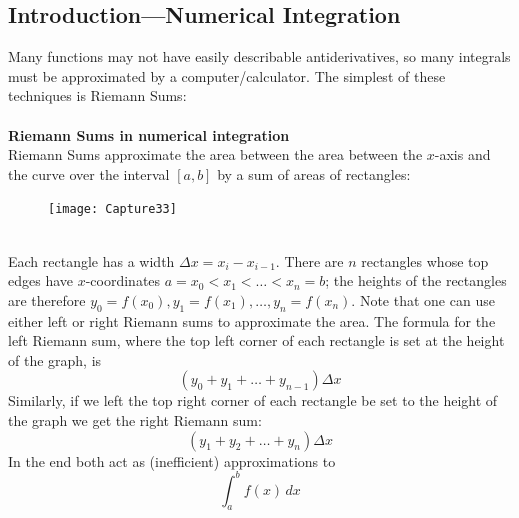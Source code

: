 \documentclass{report}
\begin{document}
\subsection{Introduction---Numerical Integration} %
Many functions may not have easily describable antiderivatives, so many integrals
must be approximated by a computer/calculator. The simplest of these
techniques is Riemann Sums:\\
\vspace{1mm}\\
\textbf{Riemann Sums in numerical integration}\\
Riemann Sums approximate the area between the area between the $x$-axis and the 
curve over the interval $[a,b]$ by a sum of areas of rectangles:
\begin{figure}[h]
\texttt{[image: Capture33]}\\
\centering
{}
\end{figure}\\
Each rectangle has a width $\Delta x=x_i-x_{i-1}$. There
are $n$ rectangles whose top edges have $x$-coordinates 
$a=x_0<x_1<\ldots<x_n=b$; the heights of the rectangles are therefore 
$y_0=f(x_0),y_1=f(x_1),\ldots,y_n=f(x_n)$.
Note that one can use either left or right Riemann sums to approximate the area. 
The formula for the left Riemann sum, where the top
left corner of each rectangle is set at the height of the graph, is
\begin{equation*}
(y_0+y_1+\ldots+y_{n-1})\Delta x
\end{equation*}
Similarly, if we left the top right corner of each rectangle be set to the
height of the graph we get the right Riemann sum:
\begin{equation*}
(y_1+y_2+\ldots+y_n)\Delta x
\end{equation*}
In the end both act as (inefficient) approximations to
\begin{equation*}
\int_a^bf(x)\,dx
\end{equation*}
\newpage
\end{document}
